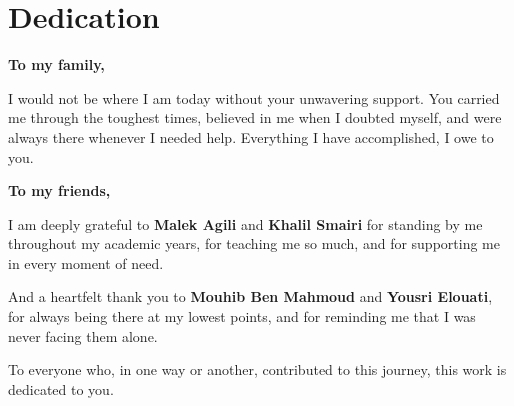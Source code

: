 \chapter*{\Huge Dedication}
\vspace{8mm}
\vspace{8mm}

\begin{center}
\itshape\large

\textbf{To my family,}

\vspace{2mm}

I would not be where I am today without your unwavering support.
You carried me through the toughest times, believed in me when I
doubted myself, and were always there whenever I needed help.
Everything I have accomplished, I owe to you.

\vspace{8mm}

\textbf{To my friends,}

\vspace{2mm}

I am deeply grateful to \textbf{Malek Agili} and \textbf{Khalil Smairi}
for standing by me throughout my academic years, for teaching me so
much, and for supporting me in every moment of need.

\vspace{4mm}

And a heartfelt thank you to \textbf{Mouhib Ben Mahmoud} and
\textbf{Yousri Elouati}, for always being there at my lowest points,
and for reminding me that I was never facing them alone.

\vspace{8mm}

To everyone who, in one way or another, contributed to this journey,
this work is dedicated to you.

\end{center}
